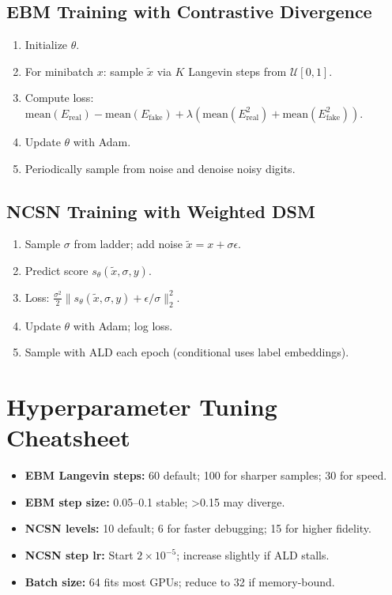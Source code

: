 \documentclass[a4paper,12pt]{article}
\begin{document}
\subsection{EBM Training with Contrastive Divergence}
\begin{enumerate}[leftmargin=*]
    \item Initialize $\theta$.
    \item For minibatch $x$: sample $\tilde{x}$ via $K$ Langevin steps from $\mathcal{U}[0,1]$.
    \item Compute loss: $\text{mean}(E_{\text{real}}) - \text{mean}(E_{\text{fake}}) + \lambda(\text{mean}(E_{\text{real}}^2)+\text{mean}(E_{\text{fake}}^2))$.
    \item Update $\theta$ with Adam.
    \item Periodically sample from noise and denoise noisy digits.
\end{enumerate}

\subsection{NCSN Training with Weighted DSM}
\begin{enumerate}[leftmargin=*]
    \item Sample $\sigma$ from ladder; add noise $\tilde{x}=x+\sigma\epsilon$.
    \item Predict score $s_\theta(\tilde{x}, \sigma, y)$.
    \item Loss: $\frac{\sigma^2}{2} \| s_\theta(\tilde{x},\sigma,y) + \epsilon/\sigma \|_2^2$.
    \item Update $\theta$ with Adam; log loss.
    \item Sample with ALD each epoch (conditional uses label embeddings).
\end{enumerate}

\section{Hyperparameter Tuning Cheatsheet}
\begin{itemize}[leftmargin=*]
    \item \textbf{EBM Langevin steps:} 60 default; 100 for sharper samples; 30 for speed.
    \item \textbf{EBM step size:} 0.05--0.1 stable; >0.15 may diverge.
    \item \textbf{NCSN levels:} 10 default; 6 for faster debugging; 15 for higher fidelity.
    \item \textbf{NCSN step lr:} Start $2\!\times\!10^{-5}$; increase slightly if ALD stalls.
    \item \textbf{Batch size:} 64 fits most GPUs; reduce to 32 if memory-bound.
\end{itemize}
\end{document}
